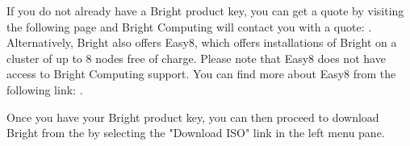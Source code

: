 If you do not already have a Bright product key, you can get a quote by
visiting the following page and Bright Computing will contact you with
a quote: \href{https://www.brightcomputing.com/get-a-quote}{\color{blue}{Get A Quote}}. Alternatively,
Bright also offers Easy8, which offers installations of Bright on a cluster
of up to 8 nodes free of charge. Please note that Easy8 does not have access
to Bright Computing support. You can find more about Easy8 from the
following link: \href{https://www.brightcomputing.com/easy8}{\color{blue}{Easy8}}.

Once you have your Bright product key, you can then proceed to download
Bright from the \href{https://customer.brightcomputing.com/Customer-Login}{\color{blue}{Bright Customer Portal}}
by selecting the "Download ISO" link in the left menu pane.
